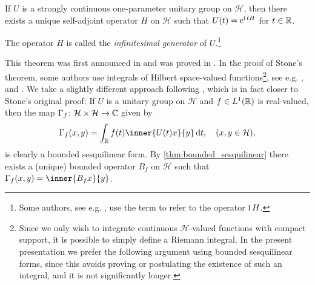 \documentclass[article, a4paper, 11pt, oneside]{memoir}
\numberwithin{equation}{chapter}
\newcommand{\calH}{\mathcal{H}}
\theoremstyle{myexample}
\theoremstyle{myexample}
\theoremstyle{myexamplebreak}
\theoremstyle{myexamplebreak}
\theoremstyle{nonumberplain}
\theoremstyle{MyNonumberplain}
\begin{document}
\begin{theorem}
    \label{thm:stone}
    If $U$ is a strongly continuous one-parameter unitary group on $\calH$, then there exists a unique self-adjoint operator $H$ on $\calH$ such that $U(t) = \operatorname{\mathrm{e}}^{\operatorname{i} tH}$ for $t \in \mathbb{R}$.
\end{theorem}
%
The operator $H$ is called the \emph{infinitesimal generator} of $U$.\footnote{Some authors, see e.g. \textcite[Theorem~6.2]{schmudgen2012}, use the term  to refer to the operator $\operatorname{i} H$.}

This theorem was first announced in \textcite{stone1930} and was proved in \textcite{stone1932b}. In the proof of Stone's theorem, some authors use integrals of Hilbert space-valued functions\footnote{Since we only wish to integrate continuous $\calH$-valued functions with compact support, it is possible to simply define a Riemann integral. In the present presentation we prefer the following argument using bounded sesquilinear forms, since this avoids proving or postulating the existence of such an integral, and it is not significantly longer.}, see e.g. \textcite[Theorem~VIII.8]{reedsimon1}, \textcite[Theorem~X.5.6]{conway1990} and \textcite[Theorem~6.2]{schmudgen2012}. We take a slightly different approach following \textcite[Lemma~10.18]{hall2013}, which is in fact closer to Stone's original proof: If $U$ is a unitary group on $\calH$ and $f \in L^1(\mathbb{R})$ is real-valued, then the map $\Gamma_f \colon \calH \times \calH \to \setC$ given by
%
\begin{equation*}
    \Gamma_f(x,y) = \int_\setR f(t) \inner{U(t)x}{y} \dif t,
    \quad (x,y \in \calH),
\end{equation*}
%
is clearly a bounded sesquilinear form. By \cref{thm:bounded_sesquilinear} there exists a (unique) bounded operator $B_f$ on $\calH$ such that $\Gamma_f(x,y) = \inner{B_f x}{y}$.
\end{document}
